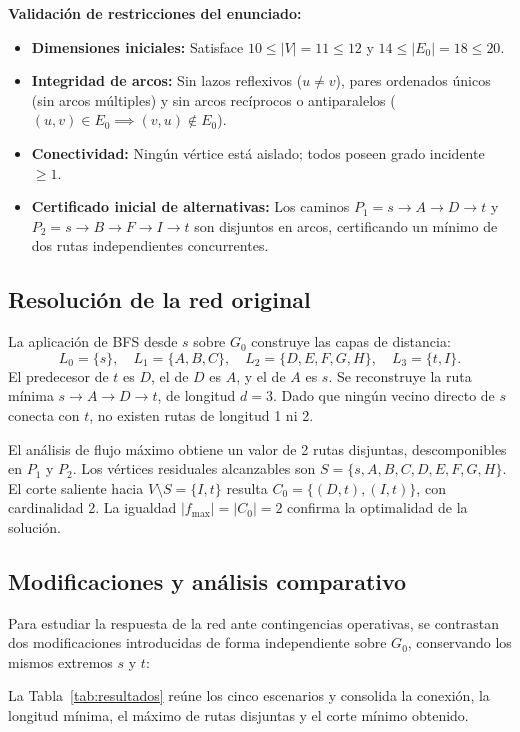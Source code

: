 \documentclass[11pt,a4paper]{article}
\newcommand{\ruta}[1]{\textcolor{verde}{\ensuremath{#1}}}
\begin{document}
\textbf{Validación de restricciones del enunciado:}
\begin{itemize}[noitemsep]
  \item \textbf{Dimensiones iniciales:} Satisface $10 \le |V| = 11 \le 12$ y $14 \le |E_0| = 18 \le 20$.
  \item \textbf{Integridad de arcos:} Sin lazos reflexivos ($u \neq v$), pares ordenados únicos (sin arcos múltiples) y sin arcos recíprocos o antiparalelos ($(u,v) \in E_0 \implies (v,u) \notin E_0$).
  \item \textbf{Conectividad:} Ningún vértice está aislado; todos poseen grado incidente $\ge 1$.
  \item \textbf{Certificado inicial de alternativas:} Los caminos $P_1 = s \to A \to D \to t$ y $P_2 = s \to B \to F \to I \to t$ son disjuntos en arcos, certificando un mínimo de dos rutas independientes concurrentes.
\end{itemize}

\subsection{Resolución de la red original}
La aplicación de BFS desde $s$ sobre $G_0$ construye las capas de distancia:
\[
  L_0 = \{s\}, \quad L_1 = \{A, B, C\}, \quad L_2 = \{D, E, F, G, H\}, \quad L_3 = \{t, I\}.
\]
El predecesor de $t$ es $D$, el de $D$ es $A$, y el de $A$ es $s$. Se reconstruye la ruta mínima \ruta{s \to A \to D \to t}, de longitud $d=3$. Dado que ningún vecino directo de $s$ conecta con $t$, no existen rutas de longitud 1 ni 2.

El análisis de flujo máximo obtiene un valor de 2 rutas disjuntas, descomponibles en $P_1$ y $P_2$. Los vértices residuales alcanzables son $S = \{s, A, B, C, D, E, F, G, H\}$. El corte saliente hacia $V \setminus S = \{I, t\}$ resulta $C_0 = \{ (D, t), (I, t) \}$, con cardinalidad 2. La igualdad $|f_{\max}| = |C_0| = 2$ confirma la optimalidad de la solución.

\subsection{Modificaciones y análisis comparativo}
Para estudiar la respuesta de la red ante contingencias operativas, se contrastan dos modificaciones introducidas de forma independiente sobre $G_0$, conservando los mismos extremos $s$ y $t$:

La Tabla~\ref{tab:resultados} reúne los cinco escenarios y consolida la conexión, la longitud mínima, el máximo de rutas disjuntas y el corte mínimo obtenido.
\end{document}
